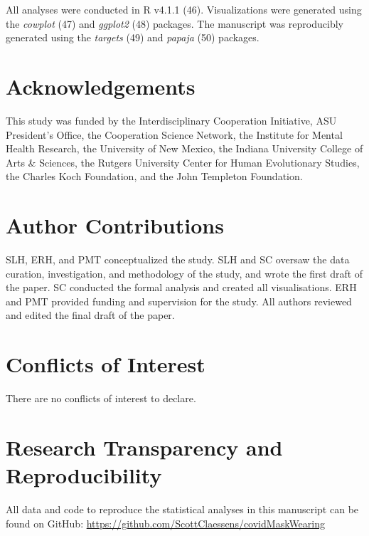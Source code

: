 \documentclass[
  man,floatsintext]{apa6}
\begin{document}
All analyses were conducted in R v4.1.1 (46). Visualizations were generated using the \emph{cowplot} (47) and \emph{ggplot2} (48) packages. The manuscript was reproducibly generated using the \emph{targets} (49) and \emph{papaja} (50) packages.

\newpage

\hypertarget{acknowledgements}{%
\section{Acknowledgements}\label{acknowledgements}}

This study was funded by the Interdisciplinary Cooperation Initiative, ASU President's Office, the Cooperation Science Network, the Institute for Mental Health Research, the University of New Mexico, the Indiana University College of Arts \& Sciences, the Rutgers University Center for Human Evolutionary Studies, the Charles Koch Foundation, and the John Templeton Foundation.

\hypertarget{author-contributions}{%
\section{Author Contributions}\label{author-contributions}}

SLH, ERH, and PMT conceptualized the study. SLH and SC oversaw the data curation, investigation, and methodology of the study, and wrote the first draft of the paper. SC conducted the formal analysis and created all visualisations. ERH and PMT provided funding and supervision for the study. All authors reviewed and edited the final draft of the paper.

\hypertarget{conflicts-of-interest}{%
\section{Conflicts of Interest}\label{conflicts-of-interest}}

There are no conflicts of interest to declare.

\hypertarget{research-transparency-and-reproducibility}{%
\section{Research Transparency and Reproducibility}\label{research-transparency-and-reproducibility}}

All data and code to reproduce the statistical analyses in this manuscript can be found on GitHub: \url{https://github.com/ScottClaessens/covidMaskWearing}
\end{document}
